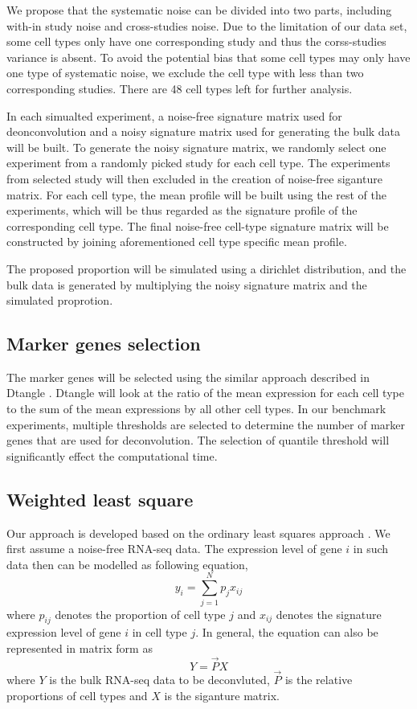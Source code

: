 \documentclass[10pt, a4paper, oneside]{article}
\begin{document}
We propose that the systematic noise can be divided into two parts, including with-in study noise and cross-studies noise.
Due to the limitation of our data set, some cell types only have one corresponding study and thus 
the corss-studies variance is absent. To avoid the potential bias that some cell types may only have one type of systematic noise,
we exclude the cell type with less than two corresponding studies. There are 48 cell types left for further analysis.

In each simualted experiment, a noise-free signature matrix used for deonconvolution and a noisy signature matrix used for
generating the bulk data will be built. To generate the noisy signature matrix, we randomly select one experiment from a randomly picked
study for each cell type. The experiments from selected study will then excluded in the creation of noise-free siganture matrix.
For each cell type, the mean profile will be built using the rest of the experiments, which will be thus regarded as the 
signature profile of the corresponding cell type. The final noise-free cell-type signature matrix will be constructed by joining
aforementioned cell type specific mean profile.

The proposed proportion will be simulated using a dirichlet distribution, and the bulk data is generated by multiplying the
noisy signature matrix and the simulated proprotion.

\subsection{Marker genes selection}
\justify 
The marker genes will be selected using the similar approach described in Dtangle \cite{hunt2019dtangle}.
Dtangle will look at the ratio of the mean expression for each cell type to the sum of the mean expressions by all other cell types.
In our benchmark experiments, multiple thresholds are selected to determine the number of marker genes that are used for deconvolution.
The selection of quantile threshold will significantly effect the computational time.

\subsection{Weighted least square}
\justify
Our approach is developed based on the ordinary least squares approach \cite{gong2013deconrnaseq}. 
We first assume a noise-free RNA-seq data. The expression level of gene $i$ in such data
then can be modelled as following equation,
\begin{equation}
    y_{i} = \sum_{j=1}^N p_{j}x_{ij}
\end{equation}
where $p_{ij}$ denotes the proportion of cell type $j$ and $x_{ij}$ denotes the signature expression level of gene $i$ in cell type $j$.
In general, the equation can also be represented in matrix form as
\begin{equation}
    Y = \vec{P}X 
\end{equation}
where $Y$ is the bulk RNA-seq data to be deconvluted, $\vec{P}$ is the relative proportions of cell types and $X$ is the siganture matrix.
\end{document}

